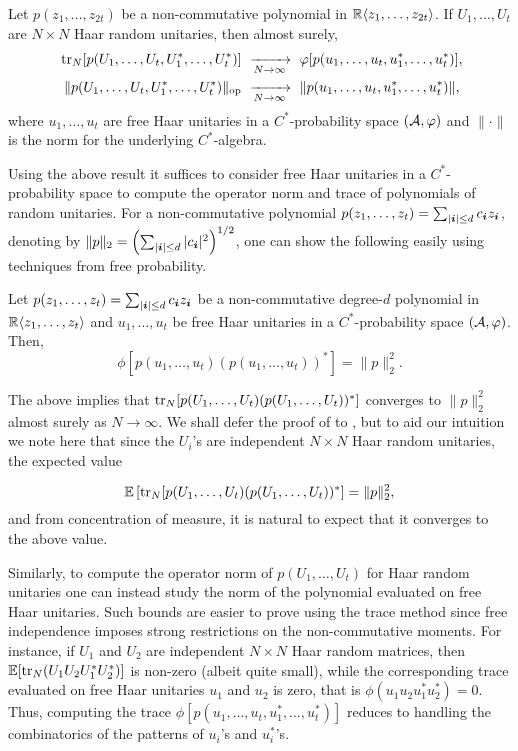 \begin{theorem}[\cite{V98, CM11}] \label{thm:voiculescu}
    Let $p(z_1, \ldots, z_{2t})$ be a non-commutative polynomial in ${\mathbb R}\langle z_1, \ldots, z_{2t}\rangle$. If $U_1, \ldots, U_t$ are $N \times N$ Haar random unitaries, then almost surely,
    \begin{align*}
     \ \mathrm{tr}_N[p(U_1, \ldots, U_t, U^*_1, \ldots, U_t^*)] &~\xrightarrow[N \to \infty]{}~ \varphi[p(u_1, \ldots, u_t, u^*_1, \ldots, u^*_t)],\\
    \  \|p(U_1, \ldots, U_t, U^*_1, \ldots, U_t^*)\|_{\mathrm{op}} &~\xrightarrow[N \to \infty]{}~ \| p(u_1, \ldots, u_t, u^*_1, \ldots, u^*_t)\|,
    \end{align*}
    where $u_1, \ldots, u_t$ are free Haar unitaries in a $C^*$-probability space $(\mathcal A, \varphi)$ and $\|\cdot\|$ is the norm for the underlying $C^*$-algebra.
\end{theorem}




Using the above result it suffices to consider free Haar unitaries in a $C^*$-probability space to compute the operator norm and trace of polynomials of random unitaries. For a non-commutative polynomial $p(z_1, \ldots, z_t) = \sum_{|{\boldsymbol{i}}|\le d} c_{{\boldsymbol{i}}}z_{{\boldsymbol{i}}}$, denoting by $\|p\|_2 =  \left(\sum_{|{\boldsymbol{i}}| \le d} |c_{{\boldsymbol{i}}}|^2\right)^{1/2}$, one can show the following easily using techniques from free probability. 

\begin{lemma} \label{thm:trace}
    Let $p(z_1, \ldots, z_t) = \sum_{|{\boldsymbol{i}}|\le d} c_{{\boldsymbol{i}}}z_{{\boldsymbol{i}}} $ be a non-commutative degree-$d$ polynomial in ${\mathbb R}\langle z_1, \ldots, z_t\rangle$ and $u_1, \ldots, u_t$ be free Haar unitaries in a $C^*$-probability space $(\mathcal A, \varphi)$. Then, 
     \[ \phi[p(u_1, \ldots, u_t) (p(u_1, \ldots, u_t))^*] =  \|p\|_2^2.\]
\end{lemma}

The above implies that $\mathrm{tr}_N[p(U_1, \ldots, U_t) (p(U_1, \ldots, U_t))^*]$ converges to $\|p\|_2^2$ almost surely as $N \to \infty$. We shall defer the proof of  to , but to aid our intuition we note here that since the  $U_i$'s are independent $N \times N$ Haar random unitaries, the expected value

\[ \mathbb{E}\left[\mathrm{tr}_N[p(U_1, \ldots, U_t) (p(U_1, \ldots, U_t))^*\right] = \|p\|_2^2,\] 
{and from concentration of measure, it is natural to expect that it converges to the above value}. 


Similarly, to compute the operator norm of $p(U_1, \ldots, U_t)$ for Haar random unitaries one can instead study the norm of the polynomial evaluated on free Haar unitaries. Such bounds are easier to prove using the trace method since free independence imposes strong restrictions on the non-commutative moments. For instance, if $U_1$ and $U_2$ are independent $N \times N$ Haar random matrices, then $\mathbb{E}[\mathrm{tr}_N(U_1U_2U^*_1U_2^*)]$ is non-zero (albeit quite small), while the corresponding trace evaluated on free Haar unitaries $u_1$ and $u_2$ is zero, that is $\phi(u_1u_2u^*_1u_2^*) = 0$. Thus, computing the trace $\phi[p(u_1,\ldots, u_t, u^*_1, \ldots, u_t^*)]$ reduces to handling the combinatorics of the patterns of $u_i$'s and $u_i^*$'s. 

